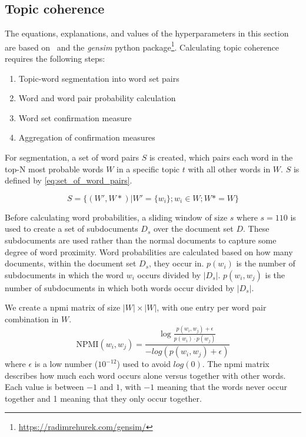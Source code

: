 \subsection{Topic coherence}\label{app:topic_coherence}
The equations, explanations, and values of the hyperparameters in this section are based on~\citet{Syed2017coherence} and the \textit{gensim} python package\footnote{\url{https://radimrehurek.com/gensim/}}.
Calculating topic coherence requires the following steps:

\begin{enumerate}
\item Topic-word segmentation into word set pairs
\item Word and word pair probability calculation
\item Word set confirmation measure
\item Aggregation of confirmation measures
\end{enumerate}

For segmentation, a set of word pairs $S$ is created, which pairs each word in the top-N most probable words $W$ in a specific topic $t$ with all other words in $W$.
$S$ is defined by \autoref{eq:set_of_word_pairs}.

\begin{equation}\label{eq:set_of_word_pairs}
	S = \{(W', W*)|W' = \{w_i\};w_i \in W;W* = W\}
\end{equation}

Before calculating word probabilities, a sliding window of size $s$ where $s =110$ is used to create a set of subdocuments $D_s$ over the document set $D$.
These subdocuments are used rather than the normal documents to capture some degree of word proximity.
Word probabilities are calculated based on how many documents, within the document set $D_s$, they occur in.
$p(w_i)$ is the number of subdocuments in which the word $w_i$ occurs divided by $|D_s|$.
$p(w_i, w_j)$ is the number of subdocuments in which both words occur divided by $|D_s|$. 

We create a \gls{npmi} matrix of size $|W|\times|W|$, with one entry per word pair combination in $W$.
\begin{equation}\label{eq:coherence_2}
	\text{NPMI}(w_i,w_j) =  \frac{\log\frac{p(w_i,w_j) + \epsilon}{p(w_i)\cdot p(w_j)}}{-log(p(w_i,w_j) + \epsilon)}
\end{equation}
\noindent where $\epsilon$ is a low number ($10^{-12}$) used to avoid $log(0)$.
The \gls{npmi} matrix describes how much each word occurs alone versus together with other words.
Each value is between $-1$ and $1$, with $-1$ meaning that the words never occur together and 1 meaning that they only occur together.

